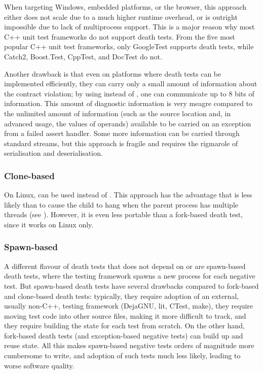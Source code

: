 When targeting Windows, embedded platforms, or the browser, this approach either does not scale due to a much higher runtime overhead, or is outright impossible due to lack of multiprocess support. This is a major reason why most C++ unit test frameworks do not support death tests. From the five most popular C++ unit test frameworks, only GoogleTest supports death tests, while Catch2, Boost.Test, CppTest, and DocTest do not.

Another drawback is that even on platforms where death tests can be implemented efficiently, they can carry only a small amount of information about the contract violation; by using  instead of , one can communicate up to 8 bits of information. This amount of diagnostic information is very meagre compared to the unlimited amount of information (such as the source location and, in advanced usage, the values of operands) available to be carried on an exception from a failed assert handler. Some more information can be carried through standard streams, but this approach is fragile and requires the rigmarole of serialisation and deserialisation.

\subsubsection{Clone-based}

On Linux,  can be used instead of . This approach has the advantage that  is less likely than  to cause the child to hang when the parent process has multiple threads (see \cite{GTestDocDeathTests}). However, it is even less portable than a fork-based death test, since it works on Linux only.

\subsubsection{Spawn-based}

A different flavour of death tests that does not depend on  or  are spawn-based death tests, where the testing framework spawns a new process for each negative test. But spawn-based death tests have several drawbacks compared to fork-based and clone-based death tests: typically, they require adoption of an external, usually non-C++, testing framework (DejaGNU, lit, CTest, make), they require moving test code into other source files, making it more difficult to track, and they require building the state for each test from scratch. On the other hand, fork-based death tests (and exception-based negative tests) can build up and reuse state. All this makes spawn-based negative tests orders of magnitude more cumbersome to write, and adoption of such tests much less likely, leading to worse software quality.

